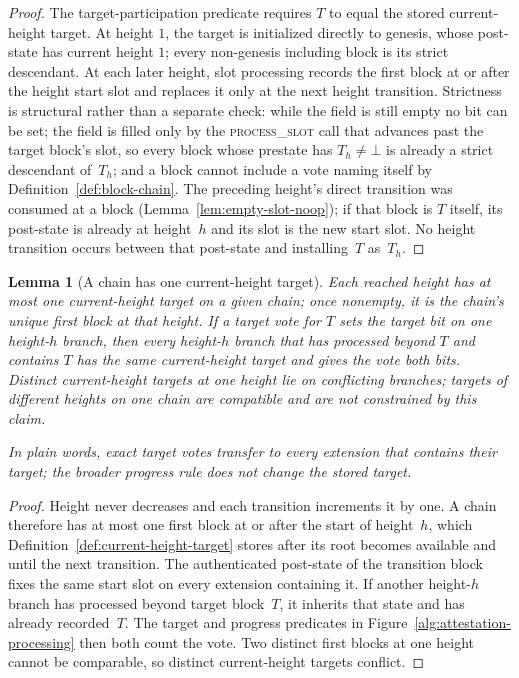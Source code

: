 \ifx\litemode\undefined\documentclass{article}\fi
\theoremstyle{plain}
\newtheorem{lemma}{Lemma}
\theoremstyle{definition}
\theoremstyle{remark}
\begin{document}
\begin{proof}
The target-participation predicate requires \(T\) to equal the stored
current-height target.  At height \(1\), the target is initialized directly
to genesis, whose post-state has current height \(1\); every non-genesis
including block is its strict descendant.  At each later height, slot processing records the
first block at or after the height start slot and replaces it only at the next
height transition.  Strictness is structural rather than a separate check:
while the field is still empty no bit can be set; the field is filled only by
the \textsc{process\_slot} call that advances past the target block's slot, so every block whose
prestate has \(T_h\neq\bot\) is already a strict descendant of~\(T_h\); and a
block cannot include a vote naming itself by
Definition~\ref{def:block-chain}.  The preceding height's direct transition was consumed at a block
(Lemma~\ref{lem:empty-slot-noop}); if that block is \(T\) itself, its
post-state is already
at height~\(h\) and its slot is the new start slot.  No height transition
occurs between that post-state and installing~\(T\) as~\(T_h\).
\end{proof}

\begin{lemma}[A chain has one current-height target]\label{lem:chain-target-uniqueness}
Each reached height has at most one current-height target on a given chain;
once nonempty, it is the chain's unique first block at that height.  If a
target vote for \(T\) sets the target bit on one height-\(h\) branch, then
every height-\(h\) branch that has processed beyond \(T\) and contains \(T\)
has the same current-height target and gives the vote both bits.  Distinct
current-height targets at one height lie on conflicting branches; targets
of different heights on one chain are compatible and are not constrained
by this claim.

In plain words, exact target votes transfer to every extension that contains
their target; the broader progress rule does not change the stored target.
\end{lemma}

\begin{proof}
Height never decreases and each transition increments it by one.  A chain
therefore has at most one first block at or after the start of height~\(h\), which
Definition~\ref{def:current-height-target} stores after its root becomes available and until
the next transition.  The authenticated post-state of the transition block
fixes the same start slot on every extension containing it.  If another
height-\(h\) branch has processed beyond target block~\(T\), it inherits that
  state and has already recorded~\(T\).  The target and progress predicates in
  Figure~\ref{alg:attestation-processing} then both count the vote.  Two distinct first
blocks at one height cannot be comparable, so distinct current-height targets
conflict.
\end{proof}
\end{document}
